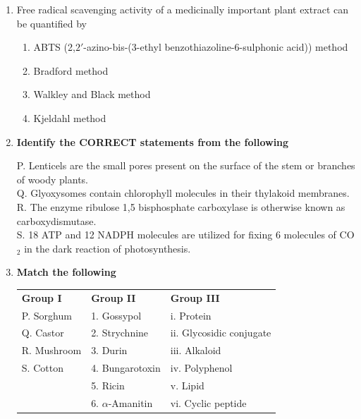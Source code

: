 \documentclass[journal,12pt,onecolumn]{IEEEtran}
\theoremstyle{remark}
\begin{document}
\begin{enumerate}
\item Free radical scavenging activity of a medicinally important plant extract can be quantified by 
\hfill{}

\begin{enumerate}
\item ABTS (2,${2'}$-azino-bis-(3-ethyl benzothiazoline-6-sulphonic acid)) method
\item Bradford method
\item Walkley and Black method
\item Kjeldahl method
\end{enumerate}

\item \textbf{Identify the CORRECT statements from the following} 
\hfill{}

P. Lenticels are the small pores present on the surface of the stem or branches of woody plants. \\
Q. Glyoxysomes contain chlorophyll molecules in their thylakoid membranes. \\
R. The enzyme ribulose 1,5 bisphosphate carboxylase is otherwise known as carboxydismutase. \\
S. 18 ATP and 12 NADPH molecules are utilized for fixing 6 molecules of CO$_2$ in the dark reaction of photosynthesis.

\begin{enumerate}
\end{enumerate}

\item \textbf{Match the following} 
\hfill{}

\begin{center}
\begin{tabular}{lll}
\textbf{Group I} & \textbf{Group II} & \textbf{Group III} \\
P. Sorghum & 1. Gossypol & i. Protein \\
Q. Castor & 2. Strychnine & ii. Glycosidic conjugate \\
R. Mushroom & 3. Durin & iii. Alkaloid \\
S. Cotton & 4. Bungarotoxin & iv. Polyphenol \\
& 5. Ricin & v. Lipid \\
& 6. $\alpha$-Amanitin & vi. Cyclic peptide
\end{tabular}
\end{center}


\end{enumerate}
\end{document}
